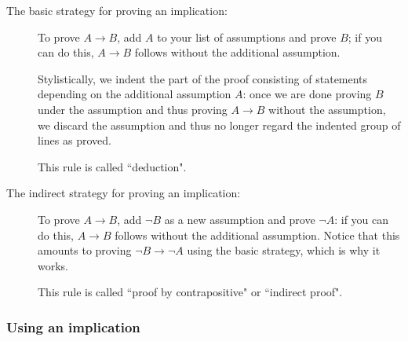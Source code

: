 \documentclass[12pt]{article}
\begin{document}
\begin{description}

\item[The basic strategy for proving an implication:]  To prove $A \rightarrow B$, add $A$ to your list of assumptions and prove $B$; if you can do this, $A \rightarrow B$ follows without the additional assumption.

Stylistically, we indent the part of the proof consisting of statements depending on the additional assumption $A$:  once we are done proving $B$ under the assumption and thus proving $A \rightarrow B$ without the assumption, we discard the assumption and thus no longer regard the indented group of lines as proved.

This rule is called ``deduction".

\item[The indirect strategy for proving an implication:]  To prove $A \rightarrow B$, add $\neg B$ as a new assumption and prove $\neg A$:  if you can do this, $A \rightarrow B$ follows without the additional assumption.  Notice that this amounts to proving $\neg B \rightarrow \neg A$ using the basic strategy, which is why it works.

This rule is called ``proof by contrapositive" or ``indirect proof".

\end{description}

\subsubsection{Using an implication}
\end{document}
